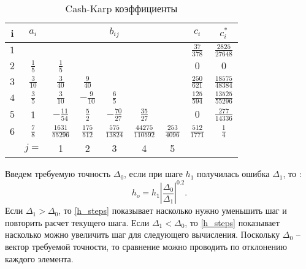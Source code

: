 \begin{table} [htbp]%
	\centering
	\parbox{15cm}{%
        \caption{Cash-Karp коэффициенты}%
        \label{Cash_Karp}%

\begin{tabular}{||c|c|c|c|c|c|c|c|c||}
\hline
i & $a_i$ & & & $b_{ij}$ & & & $c_i$ & $c_i^*$\\
\hline
$1$ & & & & & & & $\frac{37}{378}$ & $\frac{2825}{27648}$\\
\hline
$2$ & $\frac{1}{5}$ & $\frac{1}{5}$ & & & & & $0$ & $0$\\
\hline
$3$ & $\frac{3}{10}$ & $\frac{3}{40}$ & $\frac{9}{40}$ & & & & $\frac{250}{621}$ & $\frac{18575}{48384}$\\
\hline
$4$ & $\frac{3}{5}$ & $\frac{3}{10}$ & $-\frac{9}{10}$ & $\frac{6}{5}$ & & & $\frac{125}{594}$ & $\frac{13525}{55296}$\\
\hline
$5$ & 1 & $-\frac{11}{54}$ & $\frac{5}{2}$ & $-\frac{70}{27}$ & $\frac{35}{27}$ & & $0$ & $\frac{277}{14336}$\\
\hline
$6$ & $\frac{7}{8}$ & $\frac{1631}{55296}$ & $\frac{175}{512}$ & $\frac{575}{13824}$ & $\frac{44275}{110592}$ & $\frac{253}{4096}$ & $\frac{512}{1771}$ & $\frac{1}{4}$\\
\hline
& $j=$ & 1 & 2 & 3 & 4 & 5 & & \\
\hline
\end{tabular}
}
\end{table}

Введем требуемую точность $\Delta_0$, если при шаге $h_1$ получилась ошибка $\Delta_1$, то  \cite{Press2002}:
\begin{equation}\label{h_steps}
h_o=h_1\left|\frac{\Delta_0}{\Delta_1}\right|^{0.2}.
\end{equation}
Если $\Delta_1 > \Delta_0$, то \eqref{h_steps} показывает насколько нужно уменьшить шаг и повторить расчет текущего шага. Если $\Delta_1 < \Delta_0$, то \eqref{h_steps} показывает насколько можно увеличить шаг для следующего вычисления. Поскольку $\Delta_0$ -- вектор требуемой точности, то сравнение можно проводить по отклонению каждого элемента.


